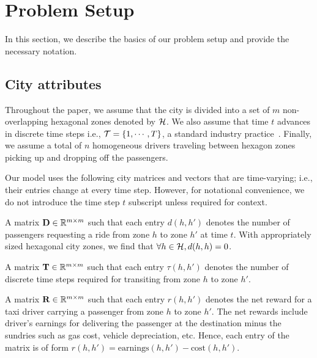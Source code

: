 \section{Problem Setup}
\label{sec:problem_setup}
In this section, we describe the basics of our problem setup and provide 
the necessary notation.

\subsection{City attributes}

Throughout the paper, we assume that the city is divided into a set of 
    $m$ non-overlapping hexagonal zones denoted by ${{{\mathcal{H}}}}$. 
We also assume that time $t$ advances in discrete time steps i.e., 
    ${{\mathcal{T}}} = \{1, \cdots, T\}$, a standard industry practice~\cite{Chen2019-ko}.
Finally, we assume a total of $n$ homogeneous drivers
    traveling between hexagon zones picking up and dropping off the passengers.

Our model uses the following city matrices and vectors that are time-varying; 
    i.e.,  their entries change at every time step. However, for notational 
    convenience, we do not introduce the time step $t$ subscript unless 
    required for context. 

A matrix ${{\mathbf{D}}} \in \mathbb{R}^{m \times m}$ such that each entry
    $d(h, h')$ denotes the number of passengers requesting a ride from zone $h$ to
    zone $h'$ at time $t$. 
With appropriately sized hexagonal city zones, we find that
    $\forall h \in {{{\ensuremath{\mathcal{H}}}}}, d(h, h)=0$.

A matrix ${{\mathbf{T}}} \in \mathbb{R}^{m \times m}$ such that each entry
    $\tau(h, h')$ denotes the number of discrete time steps required for transiting 
    from zone $h$ to zone $h'$. 

A matrix ${{\mathbf{R}}} \in \mathbb{R}^{m \times m}$ such that each entry 
    $r(h,h')$ denotes the net reward for a taxi driver carrying a passenger 
    from zone $h$ to zone $h'$. 
The net rewards include driver's earnings for delivering the
    passenger at the destination minus the sundries such as gas cost, vehicle
    depreciation, etc. 
Hence, each entry of the matrix is of form $r(h, h') = \textrm{earnings}(h, h')
- \textrm{cost}(h, h')$.

